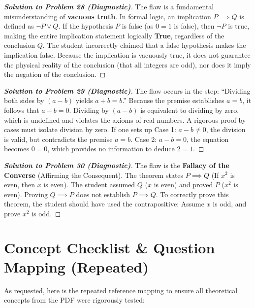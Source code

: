 \documentclass[11pt]{article}
\begin{document}
\begin{proof}[\textbf{Solution to Problem 28 (Diagnostic)}]
The flaw is a fundamental misunderstanding of \textbf{vacuous truth}. In formal logic, an implication $P \implies Q$ is defined as $\neg P \lor Q$. If the hypothesis $P$ is false (as $0 = 1$ is false), then $\neg P$ is true, making the entire implication statement logically \textbf{True}, regardless of the conclusion $Q$. The student incorrectly claimed that a false hypothesis makes the implication false. Because the implication is vacuously true, it does not guarantee the physical reality of the conclusion (that all integers are odd), nor does it imply the negation of the conclusion.
\end{proof}

\begin{proof}[\textbf{Solution to Problem 29 (Diagnostic)}]
The flaw occurs in the step: ``Dividing both sides by $(a-b)$ yields $a+b = b$.''
Because the premise establishes $a = b$, it follows that $a - b = 0$. Dividing by $(a-b)$ is equivalent to dividing by zero, which is undefined and violates the axioms of real numbers. A rigorous proof by cases must isolate division by zero. If one sets up Case 1: $a - b \neq 0$, the division is valid, but contradicts the premise $a=b$. Case 2: $a - b = 0$, the equation becomes $0 = 0$, which provides no information to deduce $2=1$.
\end{proof}

\begin{proof}[\textbf{Solution to Problem 30 (Diagnostic)}]
The flaw is the \textbf{Fallacy of the Converse} (Affirming the Consequent). The theorem states $P \implies Q$ (If $x^2$ is even, then $x$ is even). The student assumed $Q$ ($x$ is even) and proved $P$ ($x^2$ is even). Proving $Q \implies P$ does not establish $P \implies Q$. To correctly prove this theorem, the student should have used the contrapositive: Assume $x$ is odd, and prove $x^2$ is odd.
\end{proof}

\newpage

\section{Concept Checklist \& Question Mapping (Repeated)}
\label{sec:checklist_end}

As requested, here is the repeated reference mapping to ensure all theoretical concepts from the PDF were rigorously tested:
\end{document}
